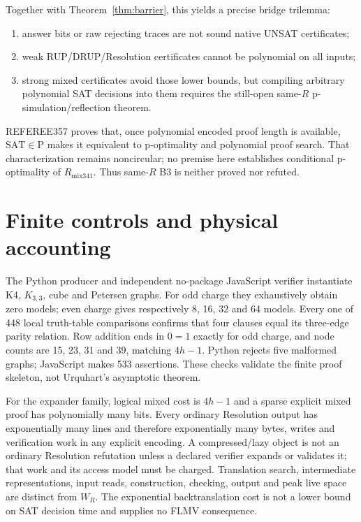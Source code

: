 \documentclass[11pt]{article}
\begin{document}
Together with Theorem~\ref{thm:barrier}, this yields a precise bridge trilemma:
\begin{enumerate}
\item answer bits or raw rejecting traces are not sound native UNSAT certificates;
\item weak RUP/DRUP/Resolution certificates cannot be polynomial on all inputs;
\item strong mixed certificates avoid those lower bounds, but compiling arbitrary polynomial SAT decisions into them requires the still-open same-$R$ p-simulation/reflection theorem.
\end{enumerate}
REFEREE357 proves that, once polynomial encoded proof length is available, $\mathrm{SAT}\in\mathrm P$ makes it equivalent to p-optimality and polynomial proof search.  That characterization remains noncircular; no premise here establishes conditional p-optimality of $R_{\mathrm{mix341}}$.  Thus same-$R$ B3 is neither proved nor refuted.

\section{Finite controls and physical accounting}

The Python producer and independent no-package JavaScript verifier instantiate K4, $K_{3,3}$, cube and Petersen graphs.  For odd charge they exhaustively obtain zero models; even charge gives respectively 8, 16, 32 and 64 models.  Every one of 448 local truth-table comparisons confirms that four clauses equal its three-edge parity relation.  Row addition ends in $0=1$ exactly for odd charge, and node counts are 15, 23, 31 and 39, matching $4h-1$.  Python rejects five malformed graphs; JavaScript makes 533 assertions.  These checks validate the finite proof skeleton, not Urquhart's asymptotic theorem.

For the expander family, logical mixed cost is $4h-1$ and a sparse explicit mixed proof has polynomially many bits.  Every ordinary Resolution output has exponentially many lines and therefore exponentially many bytes, writes and verification work in any explicit encoding.  A compressed/lazy object is not an ordinary Resolution refutation unless a declared verifier expands or validates it; that work and its access model must be charged.  Translation search, intermediate representations, input reads, construction, checking, output and peak live space are distinct from $W_R$.  The exponential backtranslation cost is not a lower bound on SAT decision time and supplies no FLMV consequence.
\end{document}
